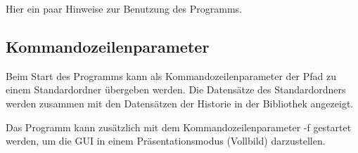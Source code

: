 Hier ein paar Hinweise zur Benutzung des Programms.

\subsection{Kommandozeilenparameter}
Beim Start des Programms kann als Kommandozeilenparameter der Pfad zu einem Standardordner übergeben werden. Die Datensätze des Standardordners werden zusammen mit den Datensätzen der Historie in der Bibliothek angezeigt.

Das Programm kann zusätzlich mit dem Kommandozeilenparameter -f gestartet werden, um die GUI in einem Präsentationsmodus (Vollbild) darzustellen.
